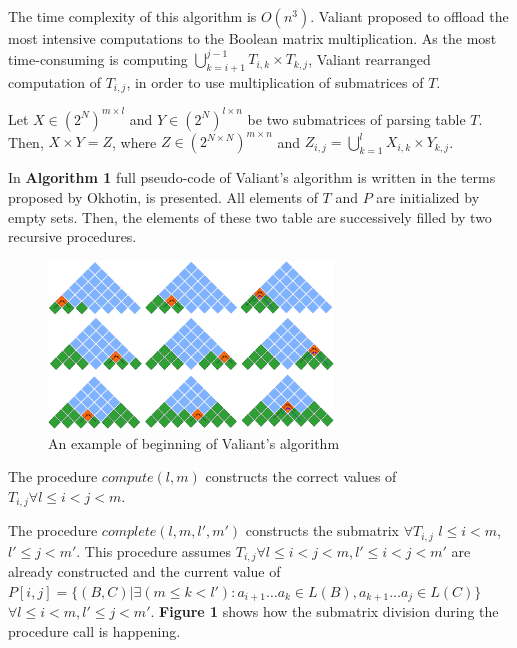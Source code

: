 The time complexity of this algorithm is $O(n^3)$. Valiant proposed to offload the most intensive computations to the Boolean matrix multiplication. As the most time-consuming is computing $\bigcup\limits_{k = i + 1}^{j - 1} T_{i, k} \times T_{k, j}$, Valiant rearranged computation of $T_{i, j}$, in order to use multiplication of submatrices of $T$.

\begin{defn}\label{def:defn4} Let $X \in (2^N)^{m \times l}$ and $Y \in (2^N)^{l \times n}$ be two submatrices of parsing table $T$. Then, $X \times Y = Z$, where $Z \in (2^{N \times N})^{m \times n}$ and $Z_{i, j} = \bigcup\limits_{k = 1}^{l} X_{i, k} \times Y_{k, j}$.
\end{defn}

In \textbf{Algorithm 1} full pseudo-code of Valiant's algorithm is written in the terms proposed by Okhotin, is presented. All elements of $T$ and $P$ are initialized by empty sets. Then, the elements of these two table are successively filled by two recursive procedures.

\begin{figure}
    \centering
    \includegraphics[width=0.675\textwidth]{pictures/valbeg.pdf}
    \caption{An example of beginning of Valiant's algorithm}
    \label{fig1}
\end{figure}

The procedure $compute(l, m)$ constructs the correct values of $T_{i,j} \forall l \le i < j < m$.

The procedure $complete(l, m, l', m')$ constructs the submatrix $\forall T_{i, j}$ $l \le i < m$, $l' \le j < m'$. This procedure assumes $T_{i, j} \forall l \leq i < j < m,  l' \leq i < j < m'$ are already constructed and the current value of  $P[i, j] =  \{ (B, C) |\exists (m \le k < l'): a_{i + 1} \dots a_{k} \in L(B), a_{k + 1} \dots a_{j} \in L(C)\}$ $\forall l \leq i < m,  l' \leq j < m'$. \textbf{Figure 1} shows how the submatrix division during the procedure call is happening.

